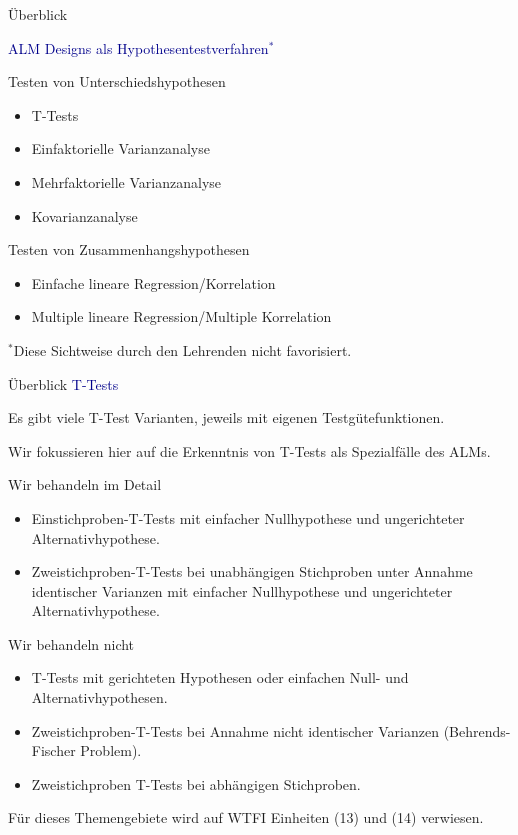 \documentclass[
  8pt,
  ignorenonframetext,
]{beamer}
\providecommand{\tightlist}{%
  \setlength{\itemsep}{0pt}\setlength{\parskip}{0pt}}
\begin{document}
\begin{frame}{Überblick}
\protect\hypertarget{uxfcberblick-2}{}

\textcolor{darkblue}{ALM Designs als Hypothesentestverfahren$^\ast$}

Testen von Unterschiedshypothesen

\begin{itemize}
\tightlist
\item
  T-Tests
\item
  Einfaktorielle Varianzanalyse
\item
  Mehrfaktorielle Varianzanalyse
\item
  Kovarianzanalyse
\end{itemize}

Testen von Zusammenhangshypothesen

\begin{itemize}
\tightlist
\item
  Einfache lineare Regression/Korrelation
\item
  Multiple lineare Regression/Multiple Korrelation
\end{itemize}

\(^\ast\)Diese Sichtweise durch den Lehrenden nicht favorisiert.
\end{frame}

\begin{frame}{Überblick}
\protect\hypertarget{uxfcberblick-3}{}
\textcolor{darkblue}{T-Tests} 

\small

Es gibt viele T-Test Varianten, jeweils mit eigenen Testgütefunktionen.

Wir fokussieren hier auf die Erkenntnis von T-Tests als Spezialfälle des
ALMs.

Wir behandeln im Detail \vspace{-2mm}

\begin{itemize}
\tightlist
\item
  \justifying Einstichproben-T-Tests mit einfacher Nullhypothese und
  ungerichteter Alternativhypothese.
\item
  Zweistichproben-T-Tests bei unabhängigen Stichproben unter Annahme
  identischer Varianzen mit einfacher Nullhypothese und ungerichteter
  Alternativhypothese.
\end{itemize}

Wir behandeln nicht \vspace{-2mm}

\begin{itemize}
\tightlist
\item
  T-Tests mit gerichteten Hypothesen oder einfachen Null- und
  Alternativhypothesen.
\item
  Zweistichproben-T-Tests bei Annahme nicht identischer Varianzen
  (Behrends-Fischer Problem).
\item
  Zweistichproben T-Tests bei abhängigen Stichproben.
\end{itemize}

Für dieses Themengebiete wird auf WTFI Einheiten (13) und (14)
verwiesen.
\end{frame}
\end{document}
